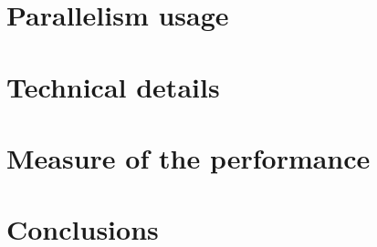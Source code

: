 \documentclass{juliacon}
\begin{document}
\section{Parallelism usage}
\label{sec:parallel}

\section{Technical details}
\label{sec:technicals}

\section{Measure of the performance}
\label{sec:performance}


\section{Conclusions}
\label{sec:conclusions}



\end{document}
